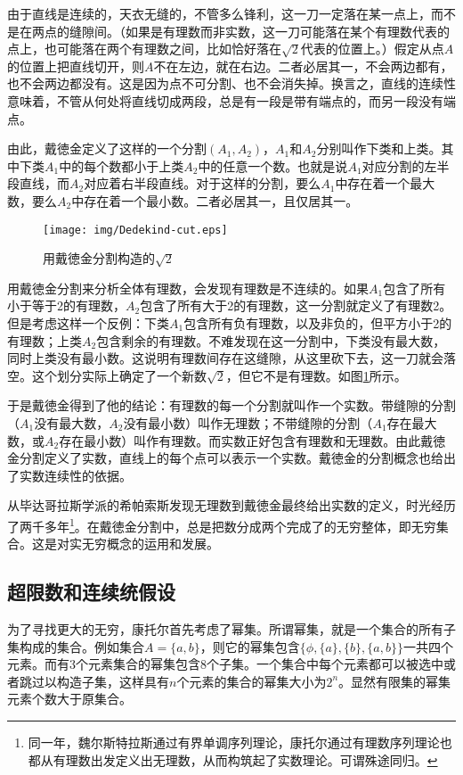 \documentclass{article}
\begin{document}
由于直线是连续的，天衣无缝的，不管多么锋利，这一刀一定落在某一点上，而不是在两点的缝隙间。（如果是有理数而非实数，这一刀可能落在某个有理数代表的点上，也可能落在两个有理数之间，比如恰好落在$\sqrt{2}$代表的位置上。）假定从点$A$的位置上把直线切开，则$A$不在左边，就在右边。二者必居其一，不会两边都有，也不会两边都没有。这是因为点不可分割、也不会消失掉。换言之，直线的连续性意味着，不管从何处将直线切成两段，总是有一段是带有端点的，而另一段没有端点。

由此，戴徳金定义了这样的一个分割$(A_1, A_2)$，$A_1$和$A_2$分别叫作下类和上类。其中下类$A_1$中的每个数都小于上类$A_2$中的任意一个数。也就是说$A_1$对应分割的左半段直线，而$A_2$对应着右半段直线。对于这样的分割，要么$A_1$中存在着一个最大数，要么$A_2$中存在着一个最小数。二者必居其一，且仅居其一。

\begin{figure}[htbp]
 \centering
 \texttt{[image: img/Dedekind-cut.eps]}
 \caption{用戴徳金分割构造的$\sqrt{2}$}
 \label{fig:Dedekind-cut}
\end{figure}

用戴徳金分割来分析全体有理数，会发现有理数是不连续的。如果$A_1$包含了所有小于等于2的有理数，$A_2$包含了所有大于2的有理数，这一分割就定义了有理数2。但是考虑这样一个反例：下类$A_1$包含所有负有理数，以及非负的，但平方小于2的有理数；上类$A_2$包含剩余的有理数。不难发现在这一分割中，下类没有最大数，同时上类没有最小数。这说明有理数间存在这缝隙，从这里砍下去，这一刀就会落空。这个划分实际上确定了一个新数$\sqrt{2}$，但它不是有理数。如图\ref{fig:Dedekind-cut}所示。

于是戴徳金得到了他的结论：有理数的每一个分割就叫作一个实数。带缝隙的分割（$A_1$没有最大数，$A_2$没有最小数）叫作无理数；不带缝隙的分割（$A_1$存在最大数，或$A_2$存在最小数）叫作有理数。而实数正好包含有理数和无理数。由此戴徳金分割定义了实数，直线上的每个点可以表示一个实数。戴徳金的分割概念也给出了实数连续性的依据。

从毕达哥拉斯学派的希帕索斯发现无理数到戴徳金最终给出实数的定义，时光经历了两千多年\footnote{同一年，魏尔斯特拉斯通过有界单调序列理论，康托尔通过有理数序列理论也都从有理数出发定义出无理数，从而构筑起了实数理论。可谓殊途同归。}。在戴徳金分割中，总是把数分成两个完成了的无穷整体，即无穷集合。这是对实无穷概念的运用和发展。

\subsection{超限数和连续统假设}

为了寻找更大的无穷，康托尔首先考虑了幂集。所谓幂集，就是一个集合的所有子集构成的集合。例如集合$A = \{a, b\}$，则它的幂集包含$\{\phi, \{a\}, \{b\}, \{a, b\}\}$一共四个元素。而有3个元素集合的幂集包含8个子集。一个集合中每个元素都可以被选中或者跳过以构造子集，这样具有$n$个元素的集合的幂集大小为$2^n$。显然有限集的幂集元素个数大于原集合。
\end{document}
